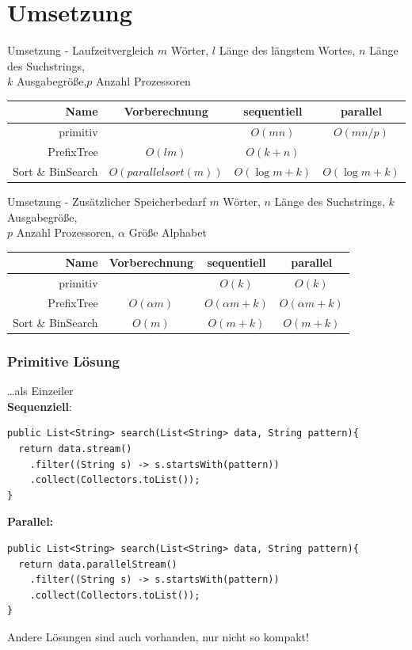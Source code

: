 \documentclass[11pt, xcolor=dvipsnames]{beamer}
\begin{document}
	\section{Umsetzung}
	\begin{frame}{Umsetzung - Laufzeitvergleich}
		$m$ Wörter, $l$ Länge des längstem Wortes, $n$ Länge des Suchstrings,\\$k$ Ausgabegröße,$p$ Anzahl Prozessoren 
		
		\begin{center}
			\begin{tabular}{r|ccc}
		\textbf{Name}	&  Vorberechnung & sequentiell & parallel \\ 
		\hline
		primitiv	& &$O(mn)$ & $O(mn/p)$ \\ 
		PrefixTree	& $O(lm)$ & $O(k+n)$ & \\
		Sort \& BinSearch & $O(parallelsort(m))$ & $O(\log m + k)$ & $O(\log m + k)$
		\end{tabular}
		\end{center} 
	\end{frame}
	
	\begin{frame}{Umsetzung - Zusätzlicher Speicherbedarf}
		$m$ Wörter, $n$ Länge des Suchstrings, $k$ Ausgabegröße, \\$p$ Anzahl Prozessoren, $\alpha$ Größe Alphabet
		\begin{center}
		\begin{tabular}{r|ccc}
			\textbf{Name}	&  Vorberechnung & sequentiell & parallel \\ 
			\hline
			primitiv	& &$ O(k)$ & $O(k)$ \\ 
			PrefixTree	& $O(\alpha m)$ & $O(\alpha m + k)$ & $O(\alpha m + k)$ \\
			Sort \& BinSearch & $O(m)$ & $O(m+k)$ & $O(m+k)$
		\end{tabular} 
		\end{center}
	\end{frame}
	
\begin{frame}[fragile]
	\frametitle{Primitive Lösung}
	\ldots als Einzeiler\\
	\textbf{Sequenziell}:
	
	\begin{lstlisting}
public List<String> search(List<String> data, String pattern){
  return data.stream()
    .filter((String s) -> s.startsWith(pattern))
    .collect(Collectors.toList());
}
	\end{lstlisting}
	\textbf{Parallel:}
		\begin{lstlisting}
public List<String> search(List<String> data, String pattern){
  return data.parallelStream()
    .filter((String s) -> s.startsWith(pattern))
    .collect(Collectors.toList());
}
		\end{lstlisting}

Andere Lösungen sind auch vorhanden, nur nicht so kompakt!
\end{frame}
\end{document}

